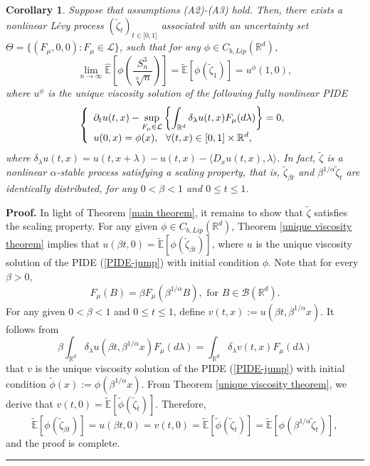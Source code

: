 \documentclass[a4paper,oneside,10pt]{article}%
\newtheorem{corollary}[theorem]{Corollary}
\newenvironment{proof}[1][Proof]{\noindent \textbf{#1.} }{\  \rule{0.5em}{0.5em}}
\numberwithin{equation}{section}
\begin{document}
\begin{corollary}
\label{corollary atable}Suppose that assumptions (A2)-(A3) hold. Then, there
exists a nonlinear L\'{e}vy process $(\tilde{\zeta}_{t})_{t\in \lbrack0,1]}$
associated with an uncertainty set $\Theta=\{(F_{\mu},0,0):F_{\mu}%
\in \mathcal{L}\}$, such that for any $\phi \in C_{b,Lip}(\mathbb{R}^{d})$,
\[
\lim_{n\rightarrow \infty}\mathbb{\hat{E}}\left[  \phi \left(  \frac{S_{n}^{3}%
}{\sqrt[\alpha]{n}}\right)  \right]  =\mathbb{\tilde{E}}[\phi(\tilde{\zeta
}_{1})]=u^{\phi}(1,0),
\]
where $u^{\phi}$ is the unique viscosity solution of the following fully
nonlinear PIDE
\begin{equation}
\left \{
\begin{array}
[c]{l}%
\displaystyle \partial_{t}u(t,x)-\sup \limits_{F_{\mu}\in \mathcal{L}}\left \{
\int_{\mathbb{R}^{d}}\delta_{\lambda}u(t,x)F_{\mu}(d\lambda)\right \}  =0,\\
\displaystyle u(0,x)=\phi(x),\text{ \ }\forall(t,x)\in \lbrack0,1]\times
\mathbb{R}^{d},
\end{array}
\right.  \label{PIDE-jump}%
\end{equation}
where $\delta_{\lambda}u(t,x)=u(t,x+\lambda)-u(t,x)-\langle D_{x}%
u(t,x),\lambda \rangle$. In fact, $\tilde{\zeta}$ is a nonlinear $\alpha
$-stable process satisfying a scaling property, that is, $\tilde{\zeta}_{\beta
t}$ and $\beta^{1/\alpha}\tilde{\zeta}_{t}$ are identically distributed, for
any $0<\beta<1$ and $0\leq t\leq1$.
\end{corollary}

\begin{proof}
In light of Theorem \ref{main theorem}, it remains to show that $\tilde{\zeta
}$ satisfies the scaling property. For any given $\phi \in C_{b,Lip}%
(\mathbb{R}^{d})$, Theorem \ref{unique viscosity theorem} implies that
$u(\beta t,0)=\mathbb{\tilde{E}}[\phi(\tilde{\zeta}_{\beta t})]$, where $u$ is
the unique viscosity solution of the PIDE (\ref{PIDE-jump}) with initial
condition $\phi$. Note that for every $\beta>0$,
\[
F_{\mu}(B)=\beta F_{\mu}(\beta^{1/\alpha}B),\text{ \ for }B\in \mathcal{B}%
(\mathbb{R}^{d}).
\]
For any given $0<\beta<1$ and $0\leq t\leq1$, define $v(t,x):=u(\beta
t,\beta^{1/\alpha}x)$. It follows from
\[
\beta \int_{\mathbb{R}^{d}}\delta_{\lambda}u(\beta t,\beta^{1/\alpha}x)F_{\mu
}(d\lambda)=\int_{\mathbb{R}^{d}}\delta_{\lambda}v(t,x)F_{\mu}(d\lambda)
\]
that $v$ is the unique viscosity solution of the PIDE (\ref{PIDE-jump}) with
initial condition $\tilde{\phi}(x):=\phi(\beta^{1/\alpha}x)$. From Theorem
\ref{unique viscosity theorem}, we derive that $v(t,0)=\mathbb{\tilde{E}%
}[\tilde{\phi}(\tilde{\zeta}_{t})]$. Therefore,
\[
\mathbb{\tilde{E}}[\phi(\tilde{\zeta}_{\beta t})]=u(\beta t,0)=v(t,0)=
\mathbb{\tilde{E}}[\tilde{\phi}(\tilde{\zeta}_{t})]=\mathbb{\tilde{E}}%
[\phi(\beta^{1/\alpha}\tilde{\zeta}_{t})],
\]
and the proof is complete.
\end{proof}
\end{document}
